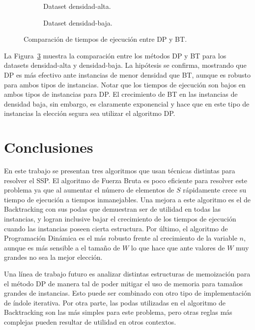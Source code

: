 \documentclass[10pt,a4paper]{article}
\begin{document}
\begin{figure}
    \centering
    \begin{subfigure}{0.45\linewidth}
        \centering
        
        \caption{Dataset densidad-alta.}
        \label{fig:comparacion-bt-dp-alta}
    \end{subfigure}
    \begin{subfigure}{0.45\linewidth}
        \centering
        
        \caption{Dataset densidad-baja.}
        \label{fig:comparacion-bt-dp-baja}
    \end{subfigure}
    \caption{Comparación de tiempos de ejecución entre DP y BT.}
    \label{fig:comparacion-bt-dp}
\end{figure}

La Figura~\ref{fig:comparacion-bt-dp} muestra la comparación entre los métodos DP y BT para los datasets densidad-alta y densidad-baja. La hipótesis se confirma, mostrando que DP es más efectivo ante instancias de menor densidad que BT, aunque es robusto para ambos tipos de instancias. Notar que los tiempos de ejecución son bajos en ambos tipos de instancias para DP. El crecimiento de BT en las instancias de densidad baja, sin embargo, es claramente exponencial y hace que en este tipo de instancias la elección segura sea utilizar el algoritmo DP.


\section{Conclusiones} \label{sec:conclusiones}
En este trabajo se presentan tres algoritmos que usan técnicas distintas para resolver el SSP. El algoritmo de Fuerza Bruta es poco eficiente para resolver este problema ya que al aumentar el número de elementos de $S$ rápidamente crece su tiempo de ejecución a tiempos inmanejables. Una mejora a este algoritmo es el de Backtracking con sus podas que demuestran ser de utilidad en todas las instancias, y logran inclusive bajar el crecimiento de los tiempos de ejecución cuando las instancias poseen cierta estructura. Por último, el algoritmo de Programación Dinámica es el más robusto frente al crecimiento de la variable $n$, aunque es más sensible a el tamaño de $W$ lo que hace que ante valores de $W$ muy grandes no sea la mejor elección.

Una línea de trabajo futuro es analizar distintas estructuras de memoización para el método DP de manera tal de poder mitigar el uso de memoria para tamaños grandes de instancias. Esto puede ser combinado con otro tipo de implementación de índole iterativa. Por otra parte, las podas utilizadas en el algoritmo de Backtracking son las más simples para este problema, pero otras reglas más complejas pueden resultar de utilidad en otros contextos.
\end{document}
